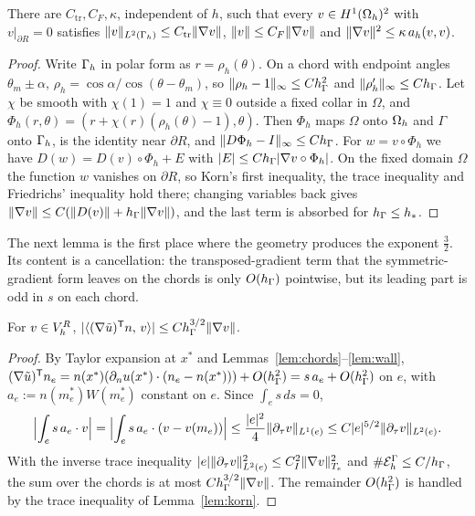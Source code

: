 \begin{lemma}\label{lem:korn}
There are $C_{\mathrm{tr}},C_F,\kappa$, independent of $h$, such that every $v\in H^1(\Omega_h)^2$ with $v|_{\partial R}=0$ satisfies
$\lVert v\rVert_{L^2(\Gamma_h)}\le C_{\mathrm{tr}}\lVert \nabla v\rVert$, $\lVert v\rVert\le C_F\lVert \nabla v\rVert$ and $\lVert \nabla v\rVert^2\le\kappa\,a_h(v,v)$.
\end{lemma}

\begin{proof}
Write $\Gamma_h$ in polar form as $r=\rho_h(\theta)$. On a chord with endpoint angles $\theta_m\pm\alpha$, $\rho_h=\cos\alpha/\cos(\theta-\theta_m)$, so $\lVert \rho_h-1\rVert_\infty\le Ch_\Gamma^2$ and $\lVert \rho_h'\rVert_\infty\le Ch_\Gamma$. Let $\chi$ be smooth with $\chi(1)=1$ and $\chi\equiv0$ outside a fixed collar in $\Omega$, and $\Phi_h(r,\theta)=(r+\chi(r)(\rho_h(\theta)-1),\theta)$. Then $\Phi_h$ maps $\Omega$ onto $\Omega_h$ and $\Gamma$ onto $\Gamma_h$, is the identity near $\partial R$, and $\lVert D\Phi_h-I\rVert_\infty\le Ch_\Gamma$. For $w=v\circ\Phi_h$ we have $D(w)=D(v)\circ\Phi_h+E$ with $|E|\le Ch_\Gamma|\nabla v\circ\Phi_h|$. On the fixed domain $\Omega$ the function $w$ vanishes on $\partial R$, so Korn's first inequality, the trace inequality and Friedrichs' inequality hold there; changing variables back gives $\lVert \nabla v\rVert\le C(\lVert D(v)\rVert+h_\Gamma\lVert \nabla v\rVert)$, and the last term is absorbed for $h_\Gamma\le h_\ast$.
\end{proof}

The next lemma is the first place where the geometry produces the exponent $\frac32$. Its content is a cancellation: the transposed-gradient term that the symmetric-gradient form leaves on the chords is only $O(h_\Gamma)$ pointwise, but its leading part is odd in $s$ on each chord.

\begin{lemma}\label{lem:transposed}
For $v\in V_h^R$, $|\langle (\nabla\tilde u)^{\mathsf T}n,\, v\rangle|\le Ch_\Gamma^{3/2}\lVert \nabla v\rVert$.
\end{lemma}

\begin{proof}
By Taylor expansion at $x^\ast$ and Lemmas~\ref{lem:chords}--\ref{lem:wall}, $(\nabla\tilde u)^{\mathsf T}n_e=n(x^\ast)(\partial_n u(x^\ast)\cdot(n_e-n(x^\ast)))+O(h_\Gamma^2)=s\,a_e+O(h_\Gamma^2)$ on $e$, with $a_e:=n(m_e^\ast)W(m_e^\ast)$ constant on $e$. Since $\int_es\,ds=0$,
\[
\Bigl|\int_es\,a_e\cdot v\Bigr|=\Bigl|\int_es\,a_e\cdot(v-v(m_e))\Bigr|\le\frac{|e|^2}{4}\lVert \partial_\tau v\rVert_{L^1(e)}\le C|e|^{5/2}\lVert \partial_\tau v\rVert_{L^2(e)} .
\]
With the inverse trace inequality $|e|\lVert \partial_\tau v\rVert_{L^2(e)}^2\le C_I^2\lVert \nabla v\rVert^2_{T_e}$ and $\#\mathcal E_h^\Gamma\le C/h_\Gamma$, the sum over the chords is at most $Ch_\Gamma^{3/2}\lVert \nabla v\rVert$. The remainder $O(h_\Gamma^2)$ is handled by the trace inequality of Lemma~\ref{lem:korn}.
\end{proof}

